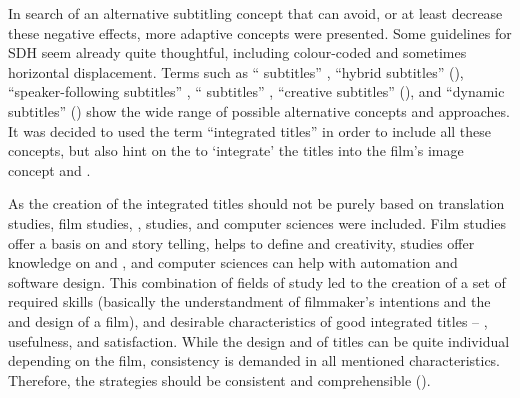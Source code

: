 In search of an alternative subtitling concept that can avoid, or at least decrease these negative effects, more adaptive concepts were presented. Some guidelines for SDH seem already quite thoughtful, including colour-coded  and sometimes horizontal displacement. Terms such as “ subtitles” \citep{nornes1999}, “hybrid subtitles” (\citealt{Diaz_cintas2006}), “speaker-following subtitles” \citep{park2008}, “ subtitles” \citep{Foerster2010}, “creative subtitles” (\citealt{mcclarty2012}), and “dynamic subtitles” (\citealt{Armstrong2014}) show the wide range of possible alternative concepts and approaches. It was decided to used the term “integrated titles” in order to include all these concepts, but also hint on the  to ‘integrate’ the titles into the film’s image concept and .

As the creation of the integrated titles should not be purely based on translation studies, film studies, ,  studies, and computer sciences were included. Film studies offer a basis on  and story telling,  helps to define  and creativity,  studies offer knowledge on  and , and computer sciences can help with automation and software design. This combination of fields of study led to the creation of a set of required skills (basically the understandment of filmmaker’s intentions and the  and design of a film), and desirable characteristics of good integrated titles – , usefulness, and satisfaction. While the design and  of titles can be quite individual depending on the film, consistency is demanded in all mentioned characteristics. Therefore, the  strategies should be consistent and comprehensible ().

